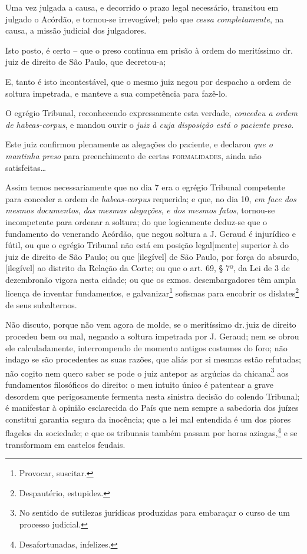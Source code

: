 Uma vez julgada a causa, e decorrido o prazo legal necessário, transitou
em julgado o Acórdão, e tornou-se irrevogável; pelo que \emph{cessa
completamente}, na causa, a missão judicial dos julgadores.

Isto posto, é certo -- que o preso continua em prisão à ordem do
meritíssimo dr.\,juiz de direito de São Paulo, que decretou-a;

E, tanto é isto incontestável, que o mesmo juiz negou por despacho a
ordem de soltura impetrada, e manteve a sua competência para fazê-lo.

O egrégio Tribunal, reconhecendo expressamente esta verdade,
\emph{concedeu a ordem de habeas-corpus}, e mandou ouvir o \emph{juiz à
cuja disposição está o paciente preso}.

Este juiz confirmou plenamente as alegações do paciente, e declarou
\emph{que o mantinha preso} para preenchimento de certas \textsc{formalidades},
ainda não satisfeitas\ldots{}

Assim temos necessariamente que no dia 7 era o egrégio Tribunal
competente para conceder a ordem de \emph{habeas-corpus} requerida; e
que, no dia 10, \emph{em face dos mesmos documentos}, \emph{das mesmas
alegações}, \emph{e dos mesmos fatos}, tornou-se incompetente para
ordenar a soltura; do que logicamente deduz-se que o fundamento do
venerando Acórdão, que negou soltura a J. Geraud é injurídico e fútil,
ou que o egrégio Tribunal não está em posição legal{[}mente{]} superior
à do juiz de direito de São Paulo; ou que {[}ilegível{]} de São Paulo, por
força do absurdo, {[}ilegível{]} ao distrito da Relação da Corte; ou que
o art. 69, § 7º, da Lei de 3 de dezembronão vigora nesta cidade; ou que
os exmos. desembargadores têm ampla licença de inventar fundamentos, e
galvanizar\footnote{ Provocar, suscitar.} sofismas para encobrir os
dislates\footnote{ Despautério, estupidez.} de seus subalternos.

Não discuto, porque não vem agora de molde, se o meritíssimo dr.\,juiz de
direito procedeu bem ou mal, negando a soltura impetrada por J. Geraud;
nem se obrou ele calculadamente, interrompendo de momento antigos
costumes do foro; não indago se são procedentes as suas razões, que
aliás por si mesmas estão refutadas; não cogito nem quero saber se pode
o juiz antepor as argúcias da chicana\footnote{ No sentido de sutilezas
  jurídicas produzidas para embaraçar o curso de um processo judicial.}
aos fundamentos filosóficos do direito: o meu intuito único é patentear
a grave desordem que perigosamente fermenta nesta sinistra decisão do
colendo Tribunal; é manifestar à opinião esclarecida do País que nem
sempre a sabedoria dos juízes constitui garantia segura da inocência;
que a lei mal entendida é um dos piores flagelos da sociedade; e que os
tribunais também passam por horas aziagas,\footnote{ Desafortunadas,
  infelizes.} e se transformam em castelos feudais.

